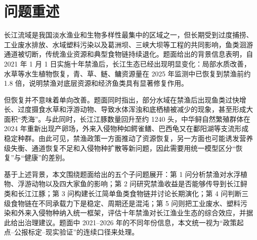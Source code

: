 \documentclass{MMCStyle}
\begin{document}
\begin{abstract}
围绕长江十年禁渔背景下鱼类生态系统的恢复与失衡问题，本文构建了“资源--功能群模块、珍稀物种模块和三级食物链混沌模块”三层框架。首先，用四类底层资源与四大家鱼功能群的耦合常微分方程刻画禁渔后资源与鱼群的传导；其次，用食源约束、人工放流和通道阻隔共同驱动的模型分析长江江豚与长江鲟的恢复过程；再次，用 Hastings-Powell 三级食物链模型展示稳定、周期振荡与更复杂不规则的长期行为，并在问题四中用最大李雅普诺夫指数识别混沌候选区间；最后，将工业污染和外来入侵物种纳入情景扩展。针对问题一，本文进一步引入四大家鱼总量与单网次捕获量代理（CPUE*）作为可观测指标，其中 2025 年“四大家鱼恢复到禁渔前约 1.8 倍”作为硬校准锚点，湖北段“单网次捕获量提升 120\%”仅作为拟合外的一致性检验；结果表明，单区校准后四大家鱼总量在 2025 年达到基线的 1.805 倍，CPUE* 达到 1.838 倍，对应相对误差分别为 0.26\% 和 16.47\%，而模型中的水草末值降至 0.204 倍，提示在当前参数组下恢复伴随底层承压上升。基线修复情景下，江豚和长江鲟末期规模分别达到初值的 1.133 倍和 1.140 倍；在污染与入侵叠加情景下，内部综合健康指数由 0.686 降至 0.575，且权重扰动后前两类情景排序存在交换，提示该指标并非完全稳健。据此，本文建议将“禁渔”与“水质治理、通道修复、定向增殖放流和入侵物种压制”联动实施。
\end{abstract}

\newpage
\tableofcontents
\newpage
{}
\pagestyle{fancy}

\section{问题重述}
长江流域是我国淡水渔业和生物多样性最集中的区域之一，但长期受到过度捕捞、工业废水排放、水域塑料污染以及葛洲坝、三峡大坝等工程的共同影响，鱼类洄游通道被切断，传统渔业资源和典型食物链持续退化。题面给出的背景信息表明，自 2021 年 1 月 1 日实施十年禁渔后，长江生态已经出现明显变化：局部水质改善，水草等水生植物恢复，青、草、鲢、鳙资源量在 2025 年监测中已恢复到禁渔前约 1.8 倍，说明禁渔对底层资源和经济鱼类具有显著修复作用。

但恢复并不意味着单向改善。题面同时指出，部分水域在禁渔后出现鱼类过快增长、过度摄食水草和浮游动物、导致水体浑浊和底栖植被减少的现象，甚至形成大面积“秃海”。与此同时，长江江豚数量回升至约 1240 头，中华鲟自然繁殖群体在 2024 年重新出现产卵场，外来入侵物种如鳄雀鳝、巴西龟又在鄱阳湖等支流形成稳定种群。由此可见，禁渔政策一方面推动了资源恢复，另一方面也可能诱发营养级失衡、通道恢复不足和入侵物种扩散等新问题，因此需要用统一模型区分“恢复”与“健康”的差别\cite{report2022,report2023}。

基于上述背景，本文围绕题面给出的五个子问题展开：第 1 问分析禁渔对水浮植物、浮游动物以及四大家鱼的影响；第 2 问研究禁渔收益是否能够传导到长江鲟类和长江江豚；第 3 问构建长江简单鱼类食物链并讨论长期演化；第 4 问判断三级食物链在不同承载力下是稳定、周期还是混沌；第 5 问则把工业废水、塑料污染和外来入侵物种纳入统一框架，评估十年禁渔对长江渔业生态的综合效应，并据此给出治理建议。题面中 2021--2026 年的不同年份信息，本文统一视为“政策起点--公报标定--现实验证”的连续口径来处理\cite{yangtzeA}。
\end{document}
